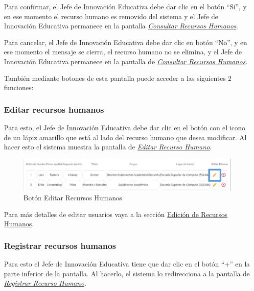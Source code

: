 \begin{enumerate}
\begin{figure}[H]
                \end{figure}

                Para confirmar, el Jefe de Innovación Educativa debe dar clic en el botón “Sí”, y en ese momento el recurso humano es removido del sistema y el Jefe de Innovación Educativa permanece en la pantalla \hyperlink{consultarRH}{\textit{Consultar Recursos Humanos}}.


                Para cancelar, el Jefe de Innovación Educativa debe dar clic en botón “No”, y en ese momento el mensaje se cierra, el recurso humano no se elimina, y el Jefe de Innovación Educativa permanece en la pantalla de \hyperlink{consultarRH}{\textit{Consultar Recursos Humanos}}.



        \end{enumerate}

        También mediante botones de esta pantalla puede acceder a las siguientes 2 funciones:

        \subsubsection{Editar recursos humanos}

            Para esto, el Jefe de Innovación Educativa debe dar clic en el botón con el icono de un lápiz amarillo que está al lado del recurso humano que desea modificar. Al hacer esto el sistema muestra la pantalla   de \hyperlink{editarRH}{\textit{Editar Recurso Humano}}.

            \begin{figure}[H]
                \centering
                \includegraphics[width=0.7\linewidth]{images/SP1/BtnEditar}
                \caption{Botón Editar Recursos Humanos}
                \label{editar}
            \end{figure}

            Para más detalles de editar usuarios vaya a la sección \hyperlink{editar-RH}{Edición de Recursos Humanos}.

        \subsubsection{Registrar recursos humanos}

            Para esto el Jefe de Innovación Educativa tiene que dar clic en el botón “+” en la parte inferior de la pantalla. Al hacerlo, el sistema  lo redirecciona a la pantalla de \hyperlink{registrarRH}{\textit{Registrar Recurso Humano}}.

